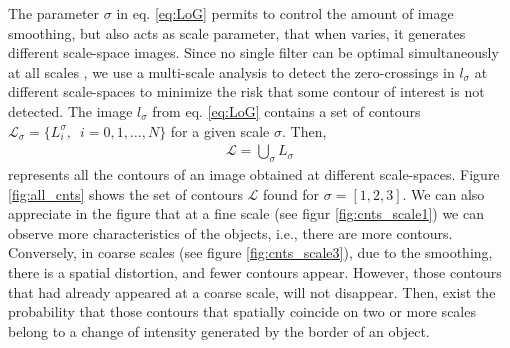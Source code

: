 The parameter $\sigma$ in eq. \eqref{eq:LoG} permits to control the amount of image smoothing, but also acts as scale parameter, that when varies, it generates different scale-space images. Since no single filter can be optimal simultaneously at all scales \citep{Marr.Hildreth:PRS:1980}, we use a multi-scale analysis \citep{Witkin:ICASSP:1984} to detect the zero-crossings in $l_\sigma$ at different scale-spaces to minimize the risk that some contour of interest is not detected. The image $l_\sigma$ from eq. \eqref{eq:LoG} contains a set of contours $\mathcal{L}_{\sigma}=\{L_{i}^{\sigma}, \enspace i=0, 1, \ldots, N\}$ for a given scale $\sigma$. Then, 
\begin{eqnarray}\label{eq:all_ctns_set}
\mathcal{L}=\bigcup\limits_{\sigma}  L_{\sigma}
\end{eqnarray}
represents all the contours of an image obtained at different scale-spaces. Figure \ref{fig:all_cnts} shows the set of contours $\mathcal{L}$ found for $\sigma=[1,2,3]$. We can also appreciate in the figure that at a fine scale (see figur \ref{fig:cnts_scale1}) we can observe more characteristics of the objects, i.e., there are more contours. Conversely, in coarse scales (see figure \ref{fig:cnts_scale3}), due to the smoothing, there is a spatial distortion, and fewer contours appear. However, those contours that had already appeared at a coarse scale, will not disappear. Then, exist the probability that those contours that spatially coincide on two or more scales belong to a change of intensity generated by the border of an object. 

